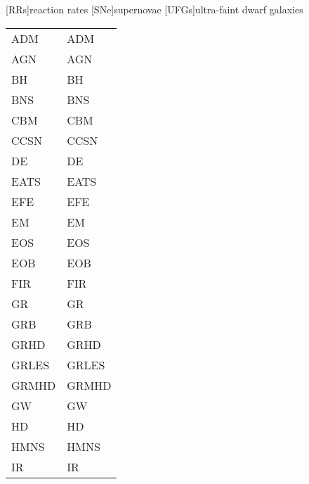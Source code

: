 {%
[RRs]{reaction rates}
[SNe]{supernovae}
[UFGs]{ultra-faint dwarf galaxies}






}{
\begin{longtable}{ p{}  p{} }
    \acs{ADM} & \acl{ADM}  \\
    \acs{AGN} & \acl{AGN}  \\
    \acs{BH} & \acl{BH}  \\
    \acs{BNS} & \acl{BNS}  \\
    \acs{CBM} & \acl{CBM}  \\
    \acs{CCSN} & \acl{CCSN}  \\
    \acs{DE} & \acl{DE}  \\
    \acs{EATS} & \acl{EATS}  \\
    \acs{EFE} & \acl{EFE}  \\
    \acs{EM} & \acl{EM}  \\
    \acs{EOS} & \acl{EOS}  \\
    \acs{EOB} & \acl{EOB}  \\
    \acs{FIR} & \acl{FIR}  \\
    \acs{GR} & \acl{GR}  \\
    \acs{GRB} & \acl{GRB}  \\
    \acs{GRHD} & \acl{GRHD}  \\
    \acs{GRLES} & \acl{GRLES}  \\
    \acs{GRMHD} & \acl{GRMHD}  \\
    \acs{GW} & \acl{GW}  \\
    \acs{HD} & \acl{HD}  \\
    \acs{HMNS} & \acl{HMNS}  \\
    \acs{IR} & \acl{IR}  \\

\end{longtable}}
